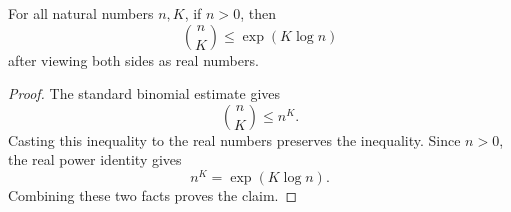 \begin{helper}
For all natural numbers \(n,K\), if \(n>0\), then
\[
\binom nK\le \exp(K\log n)
\]
after viewing both sides as real numbers.
\end{helper}
\begin{proof}
The standard binomial estimate gives
\[
\binom nK\le n^K.
\]
Casting this inequality to the real numbers preserves the inequality.  Since
\(n>0\), the real power identity gives
\[
n^K=\exp(K\log n).
\]
Combining these two facts proves the claim.
\end{proof}
